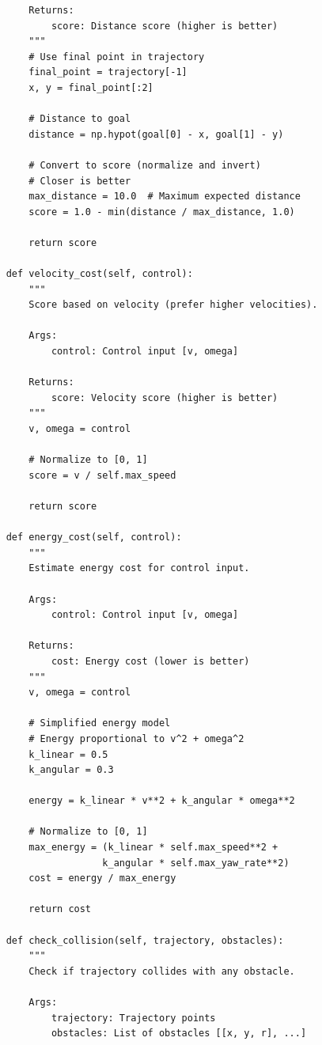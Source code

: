 \begin{lstlisting}
        Returns:
            score: Distance score (higher is better)
        """
        # Use final point in trajectory
        final_point = trajectory[-1]
        x, y = final_point[:2]
        
        # Distance to goal
        distance = np.hypot(goal[0] - x, goal[1] - y)
        
        # Convert to score (normalize and invert)
        # Closer is better
        max_distance = 10.0  # Maximum expected distance
        score = 1.0 - min(distance / max_distance, 1.0)
        
        return score
    
    def velocity_cost(self, control):
        """
        Score based on velocity (prefer higher velocities).
        
        Args:
            control: Control input [v, omega]
            
        Returns:
            score: Velocity score (higher is better)
        """
        v, omega = control
        
        # Normalize to [0, 1]
        score = v / self.max_speed
        
        return score
    
    def energy_cost(self, control):
        """
        Estimate energy cost for control input.
        
        Args:
            control: Control input [v, omega]
            
        Returns:
            cost: Energy cost (lower is better)
        """
        v, omega = control
        
        # Simplified energy model
        # Energy proportional to v^2 + omega^2
        k_linear = 0.5
        k_angular = 0.3
        
        energy = k_linear * v**2 + k_angular * omega**2
        
        # Normalize to [0, 1]
        max_energy = (k_linear * self.max_speed**2 + 
                     k_angular * self.max_yaw_rate**2)
        cost = energy / max_energy
        
        return cost
    
    def check_collision(self, trajectory, obstacles):
        """
        Check if trajectory collides with any obstacle.
        
        Args:
            trajectory: Trajectory points
            obstacles: List of obstacles [[x, y, r], ...]
            

\end{lstlisting}
